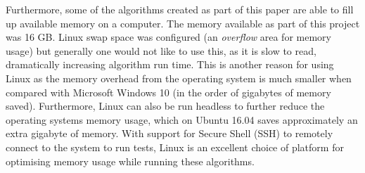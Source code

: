 Furthermore, some of the algorithms created as part of this paper are able to fill up available memory on a computer. The memory available as part of this project was 16 GB. Linux swap space was configured (an \textit{overflow} area for memory usage) but generally one would not like to use this, as it is slow to read, dramatically increasing algorithm run time. This is another reason for using Linux as the memory overhead from the operating system is much smaller when compared with Microsoft Windows 10 (in the order of gigabytes of memory saved). Furthermore, Linux can also be run headless to further reduce the operating systems memory usage, which on Ubuntu 16.04 saves approximately an extra gigabyte of memory. With support for Secure Shell (SSH) to remotely connect to the system to run tests, Linux is an excellent choice of platform for optimising memory usage while running these algorithms.
